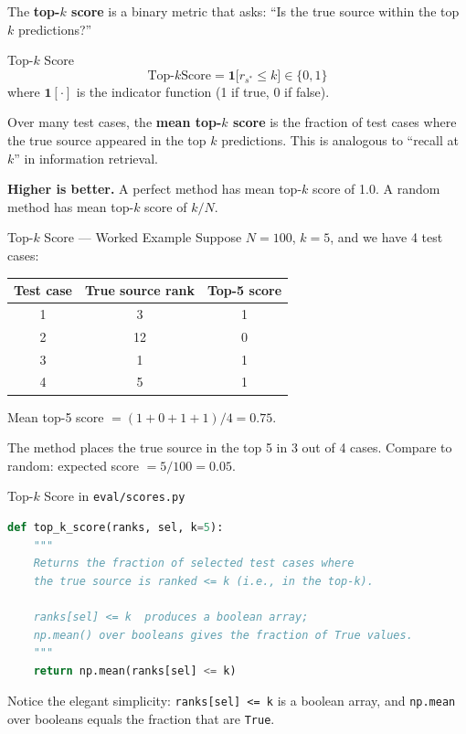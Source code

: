 The \textbf{top-$k$ score} is a binary metric that asks: ``Is the true
source within the top $k$ predictions?''

\begin{mathbox}{Top-$k$ Score}
\begin{equation}
    \text{Top-}k\text{Score} = \mathbf{1}\bigl[r_{s^*} \leq k\bigr]
    \in \{0, 1\}
    \label{eq:topk-score}
\end{equation}
where $\mathbf{1}[\cdot]$ is the indicator function (1 if true, 0 if false).

Over many test cases, the \textbf{mean top-$k$ score} is the fraction of
test cases where the true source appeared in the top $k$ predictions. This
is analogous to ``recall at $k$'' in information retrieval.

\textbf{Higher is better.} A perfect method has mean top-$k$ score of 1.0.
A random method has mean top-$k$ score of $k/N$.
\end{mathbox}

\begin{examplebox}{Top-$k$ Score — Worked Example}
Suppose $N = 100$, $k = 5$, and we have 4 test cases:

\begin{center}
\begin{tabular}{ccc}
\toprule
\textbf{Test case} & \textbf{True source rank} & \textbf{Top-5 score} \\
\midrule
1 & 3  & 1 \\
2 & 12 & 0 \\
3 & 1  & 1 \\
4 & 5  & 1 \\
\bottomrule
\end{tabular}
\end{center}

Mean top-5 score $= (1 + 0 + 1 + 1)/4 = 0.75$.

The method places the true source in the top 5 in 3 out of 4 cases. Compare
to random: expected score $= 5/100 = 0.05$.
\end{examplebox}

\begin{codewalk}{Top-$k$ Score in \texttt{eval/scores.py}}
\begin{lstlisting}[language=Python]
def top_k_score(ranks, sel, k=5):
    """
    Returns the fraction of selected test cases where
    the true source is ranked <= k (i.e., in the top-k).

    ranks[sel] <= k  produces a boolean array;
    np.mean() over booleans gives the fraction of True values.
    """
    return np.mean(ranks[sel] <= k)
\end{lstlisting}

Notice the elegant simplicity: \texttt{ranks[sel] <= k} is a boolean array,
and \texttt{np.mean} over booleans equals the fraction that are \texttt{True}.
\end{codewalk}

